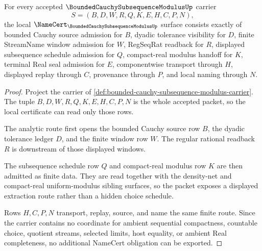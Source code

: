 \begin{theorem}
\label{thm:bounded-cauchy-subsequence-modulus-namecert-obligations}
For every accepted $\BoundedCauchySubsequenceModulusUp$ carrier
$$
S=(B,D,W,R,Q,K,E,H,C,P,N),
$$
the local $\NameCert_{\BoundedCauchySubsequenceModulusUp}$ surface consists exactly of bounded Cauchy source admission for $B$, dyadic tolerance visibility for $D$, finite StreamName window admission for $W$, RegSeqRat readback for $R$, displayed subsequence schedule admission for $Q$, compact-real modulus handoff for $K$, terminal Real seal admission for $E$, componentwise transport through $H$, displayed replay through $C$, provenance through $P$, and local naming through $N$.
\end{theorem}
\begin{proof}
Project the carrier of \autoref{def:bounded-cauchy-subsequence-modulus-carrier}. The tuple $B,D,W,R,Q,K,E,H,C,P,N$ is the whole accepted packet, so the local certificate can read only those rows.

The analytic route first opens the bounded Cauchy source row $B$, the dyadic tolerance ledger $D$, and the finite window row $W$. The regular rational readback $R$ is downstream of those displayed windows.

The subsequence schedule row $Q$ and compact-real modulus row $K$ are then admitted as finite data. They are read together with the density-net and compact-real uniform-modulus sibling surfaces, so the packet exposes a displayed extraction route rather than a hidden choice schedule.

Rows $H,C,P,N$ transport, replay, source, and name the same finite route. Since the carrier contains no coordinate for ambient sequential compactness, countable choice, quotient streams, selected limits, host equality, or ambient Real completeness, no additional NameCert obligation can be exported.
\end{proof}

